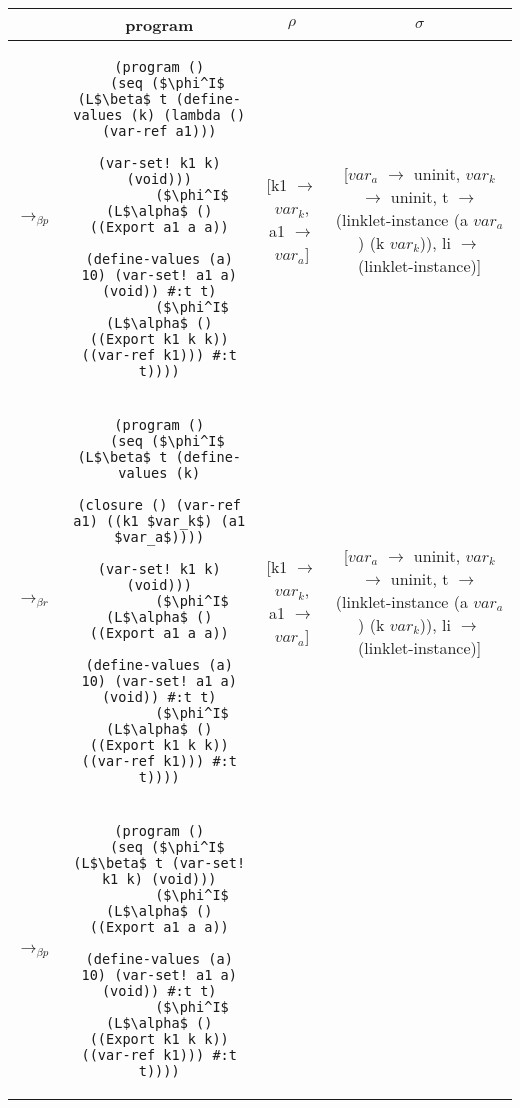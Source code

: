 \begin{table}[h!]
  \centering
  \footnotesize
  \begin{tabular}{lc|c|c}
    &\textbf{program} & \textbf{$\rho$} & \textbf{$\sigma$} \\ \hline \hline
    $\longrightarrow_{\beta p}$&\begin{lstlisting}[mathescape]
(program ()
  (seq ($\phi^I$ (L$\beta$ t (define-values (k) (lambda () (var-ref a1)))
                      (var-set! k1 k) (void)))
        ($\phi^I$ (L$\alpha$ () ((Export a1 a a))
                (define-values (a) 10) (var-set! a1 a) (void)) #:t t)
        ($\phi^I$ (L$\alpha$ () ((Export k1 k k)) ((var-ref k1))) #:t t))))
    \end{lstlisting} & \thead{[k1 $\rightarrow$ $var_k$, \\a1 $\rightarrow$ $var_a$]} & \thead{[$var_a$ $\rightarrow$ uninit,\\ $var_k$ $\rightarrow$ uninit,\\ t $\rightarrow$ (linklet-instance \\ (a $var_a$) (k $var_k$)), \\li $\rightarrow$ (linklet-instance)]} \\ \hline
    $\longrightarrow_{\beta r}$&\begin{lstlisting}[mathescape]
(program ()
  (seq ($\phi^I$ (L$\beta$ t (define-values (k)
                         (closure () (var-ref a1) ((k1 $var_k$) (a1 $var_a$))))
                      (var-set! k1 k) (void)))
        ($\phi^I$ (L$\alpha$ () ((Export a1 a a))
                (define-values (a) 10) (var-set! a1 a) (void)) #:t t)
        ($\phi^I$ (L$\alpha$ () ((Export k1 k k)) ((var-ref k1))) #:t t))))
    \end{lstlisting} & \thead{[k1 $\rightarrow$ $var_k$, \\a1 $\rightarrow$ $var_a$]} & \thead{[$var_a$ $\rightarrow$ uninit,\\ $var_k$ $\rightarrow$ uninit,\\ t $\rightarrow$ (linklet-instance \\ (a $var_a$) (k $var_k$)), \\li $\rightarrow$ (linklet-instance)]} \\ \hline
    $\longrightarrow_{\beta p}$&\begin{lstlisting}[mathescape]
(program ()
  (seq ($\phi^I$ (L$\beta$ t (var-set! k1 k) (void)))
        ($\phi^I$ (L$\alpha$ () ((Export a1 a a))
                (define-values (a) 10) (var-set! a1 a) (void)) #:t t)
        ($\phi^I$ (L$\alpha$ () ((Export k1 k k)) ((var-ref k1))) #:t t))))

\end{lstlisting}
\end{tabular}
\end{table}
